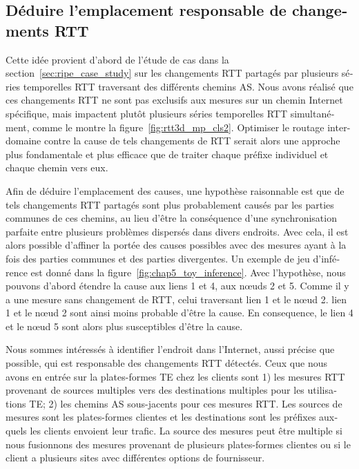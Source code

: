 \begin{otherlanguage}{french}
\section*{Déduire l'emplacement responsable de changements RTT}
Cette idée provient d'abord de l'étude de cas dans la section~\ref{sec:ripe_case_study} 
sur les changements RTT partagés par plusieurs séries temporelles RTT traversant des différents chemins AS.
Nous avons réalisé que ces changements RTT ne sont pas exclusifs aux mesures sur un chemin Internet spécifique, 
mais impactent plutôt plusieurs séries temporelles RTT simultanément, comme le montre la figure~\ref {fig:rtt3d_mp_cls2}.
Optimiser le routage inter-domaine contre la cause de tels changements de RTT 
serait alors une approche plus fondamentale et plus efficace que de traiter chaque préfixe individuel et chaque chemin vers eux.

Afin de déduire l'emplacement des causes, une hypothèse raisonnable est que 
de tels changements RTT partagés sont plus probablement causés par les parties communes de ces chemins, 
au lieu d'être la conséquence d'une synchronisation parfaite entre plusieurs problèmes dispersés dans divers endroits.
Avec cela, il est alors possible d'affiner la portée des causes possibles avec des mesures 
ayant à la fois des parties communes et des parties divergentes.
Un exemple de jeu d'inférence est donné dans la figure~\ref{fig:chap5_toy_inference}.
Avec l'hypothèse, nous pouvons d'abord étendre la cause aux liens 1 et 4, aux nœuds 2 et 5.
Comme il y a une mesure sans changement de RTT, celui traversant lien 1 et le nœud 2.
lien 1 et le nœud 2 sont ainsi moins probable d'être la cause.
En consequence, le lien 4 et le nœud 5 sont alors plus susceptibles d'être la cause.

Nous sommes intéressés à identifier l'endroit dans l'Internet, aussi précise que possible, 
qui est responsable des changements RTT détectés.
Ceux que nous avons en entrée sur la plates-formes TE chez les clients sont 
1) les mesures RTT provenant de sources multiples vers des destinations multiples pour les utilisations TE; 
2) les chemins AS sous-jacents pour ces mesures RTT.
Les sources de mesures sont les plates-formes clientes et 
les destinations sont les préfixes auxquels les clients envoient leur trafic.
La source des mesures peut être multiple si nous fusionnons des mesures provenant de plusieurs plates-formes clientes 
ou si le client a plusieurs sites avec différentes options de fournisseur.


\end{otherlanguage}
